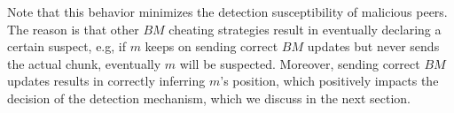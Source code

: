 
Note that this behavior minimizes the detection susceptibility of malicious peers.
The reason is that other $BM$ cheating strategies result in eventually declaring a certain suspect, e.g, if $m$ keeps on sending correct $BM$ updates but never sends the actual chunk, eventually $m$ will be suspected.
Moreover, sending correct $BM$ updates results in correctly inferring $m$'s position, which positively impacts the decision of the detection mechanism, which we discuss in the next section. 


% 




